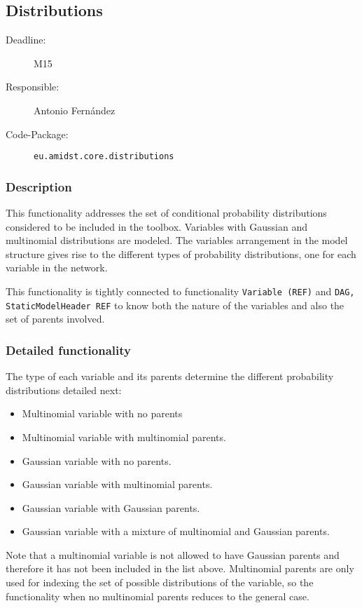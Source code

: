 \newpage
\subsection{Distributions}
\label{Distributions:D}

\begin{description}
\item[Deadline:] M15
\item[Responsible:] Antonio Fern\'andez
\item[Code-Package:] \texttt{eu.amidst.core.distributions}
\end{description}

\subsubsection*{Description}

This functionality addresses the set of conditional probability distributions considered to be included in the toolbox. Variables with Gaussian and multinomial distributions are modeled. The variables arrangement in the model structure gives rise to the different types of probability distributions, one for each variable in the network. 

This functionality is tightly connected to functionality \texttt{Variable (REF)} and \texttt{DAG, StaticModelHeader REF} to know both the nature of the variables and also the set of parents involved.



\subsubsection*{Detailed functionality}

The type of each variable and its parents determine the different probability distributions detailed next:

\begin{itemize}
\item Multinomial variable with no parents
\item Multinomial variable with multinomial parents.
\item Gaussian variable with no parents.
\item Gaussian variable with multinomial parents.
\item Gaussian variable with Gaussian parents. 
\item Gaussian variable with a mixture of multinomial and Gaussian parents. 

\end{itemize}

Note that a multinomial variable is not allowed to have Gaussian parents and therefore it has not been included in the list above.
Multinomial parents are only used for indexing the set of possible distributions of the variable, so the functionality when no multinomial parents reduces to the general case.


